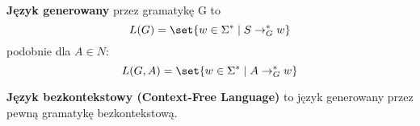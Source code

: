 \begin{definition}
    \textbf{Język  generowany} przez gramatykę G to 
    \[
        L(G) = \set{w \in \Sigma^* \mid S \rightarrow_G^* w}
    \]
    podobnie dla \( A \in N \):
    \[
        L(G, A) = \set{w \in \Sigma^* \mid A \rightarrow_G^* w}
    \]
\end{definition}

\begin{definition}
    \textbf{Język bezkontekstowy (Context-Free Language)} to język generowany przez pewną gramatykę bezkontekstową.
\end{definition}
